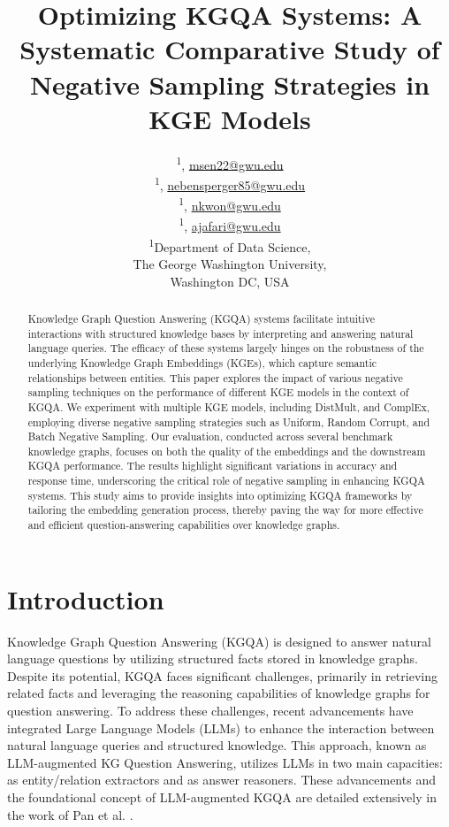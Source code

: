 \documentclass[12pt]{article}
\title{\textbf{Optimizing KGQA Systems: A Systematic Comparative Study of Negative Sampling Strategies in KGE Models}} %
\author{%
    \text{Medhasweta Sen}\textsuperscript{1}, \href{mailto:msen22@gwu.edu}{msen22@gwu.edu} \\
    \text{Nina Ebensperger}\textsuperscript{1}, \href{mailto:nebensperger85@gwu.edu}{nebensperger85@gwu.edu} \\
    \text{Nayaeun Kwon}\textsuperscript{1}, \href{mailto:nkwon@gwu.edu}{nkwon@gwu.edu} \\
    \text{Dr. Amir Jafari}\textsuperscript{1}, \href{mailto:ajafari@gwu.edu}{ajafari@gwu.edu} \\
    \textsuperscript{1}Department of Data Science, \\
    The George Washington University, \\
    Washington DC, USA
}
\date{}
\begin{document}
\raggedright

\maketitle

\begin{abstract}
Knowledge Graph Question Answering (KGQA) systems facilitate intuitive interactions with structured knowledge bases by interpreting and answering natural language queries. The efficacy of these systems largely hinges on the robustness of the underlying Knowledge Graph Embeddings (KGEs), which capture semantic relationships between entities. This paper explores the impact of various negative sampling techniques on the performance of different KGE models in the context of KGQA. We experiment with multiple KGE models, including DistMult, and ComplEx, employing diverse negative sampling strategies such as Uniform, Random Corrupt, and Batch Negative Sampling. Our evaluation, conducted across several benchmark knowledge graphs, focuses on both the quality of the embeddings and the downstream KGQA performance. The results highlight significant variations in accuracy and response time, underscoring the critical role of negative sampling in enhancing KGQA systems. This study aims to provide insights into optimizing KGQA frameworks by tailoring the embedding generation process, thereby paving the way for more effective and efficient question-answering capabilities over knowledge graphs.

\end{abstract}
\section{Introduction}

Knowledge Graph Question Answering (KGQA) is designed to answer natural language questions by utilizing structured facts stored in knowledge graphs. Despite its potential, KGQA faces significant challenges, primarily in retrieving related facts and leveraging the reasoning capabilities of knowledge graphs for question answering. To address these challenges, recent advancements have integrated Large Language Models (LLMs) to enhance the interaction between natural language queries and structured knowledge. This approach, known as LLM-augmented KG Question Answering, utilizes LLMs in two main capacities: as entity/relation extractors and as answer reasoners. These advancements and the foundational concept of LLM-augmented KGQA are detailed extensively in the work of Pan et al. \parencite{Pan2023UnifyingLL}.
\end{document}
